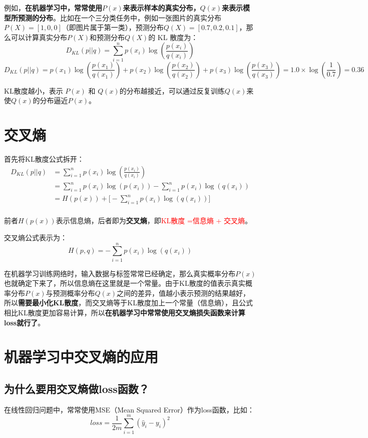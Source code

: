 \documentclass[12pt]{article}
\begin{document}
例如，\textbf{在机器学习中，常常使用$P(x)$来表示样本的真实分布，$Q(x)$来表示模型所预测的分布}。比如在一个三分类任务中，例如一张图片的真实分布$P(X)=[1,0,0]$（即图片属于第一类），预测分布$Q(X) = [0.7,0.2,0.1]$，那么可以计算真实分布$P(X)$和预测分布$Q(X)$的 KL 散度为：
$$
D_{KL}(p||q) = \sum_{i=1}^np(x_i)\log{(\frac{p(x_i)}{q(x_i)})}
$$
$$
D_{KL}(p||q) = p(x_1)\log(\frac{p(x_1)}{q(x_1)}) + p(x_2)\log(\frac{p(x_2)}{q(x_2)}) + p(x_3)\log(\frac{p(x_3)}{q(x_3)}) = 1.0 \times \log(\frac{1}{0.7}) = 0.36
$$

KL散度越小，表示 $P(x)$ 和 $Q(x)$的分布越接近，可以通过反复训练$Q(x)$来使$Q(x)$的分布逼近$P(x)$。

\section{交叉熵}
首先将KL散度公式拆开：
\begin{align}
D_{KL}(p||q) &= \sum_{i=1}^np(x_i)\log{(\frac{p(x_i)}{q(x_i)})} \\
&= \sum_{i=1}^np(x_i)\log(p(x_i)) - \sum_{i=1}^np(x_i)\log(q(x_i)) \\
&= H(p(x)) + \big[-\sum_{i=1}^np(x_i)\log(q(x_i))\big] \\
\end{align}

前者$H(p(x))$表示信息熵，后者即为\textbf{交叉熵}，即\textcolor{red}{KL散度 =信息熵 +  交叉熵}。

交叉熵公式表示为：
$$
H(p,q) = -\sum_{i=1}^np(x_i)\log(q(x_i))
$$

在机器学习训练网络时，输入数据与标签常常已经确定，那么真实概率分布$P(x)$也就确定下来了，所以信息熵在这里就是一个常量。由于KL散度的值表示真实概率分布$P(x)$与预测概率分布$Q(x)$之间的差异，值越小表示预测的结果越好，所以\textbf{需要最小化KL散度}，而交叉熵等于KL散度加上一个常量（信息熵），且公式相比KL散度更加容易计算，所以\textbf{在机器学习中常常使用交叉熵损失函数来计算loss就行了}。

\section{机器学习中交叉熵的应用\cite{CrossEntropy_Deep_Understanding}}
\subsection{为什么要用交叉熵做loss函数？}
在线性回归问题中，常常使用MSE（Mean Squared Error）作为loss函数，比如：
$$
loss = \frac{1}{2m}\sum_{i=1}^m(\hat y_i - y_i)^2
$$
\end{document}
